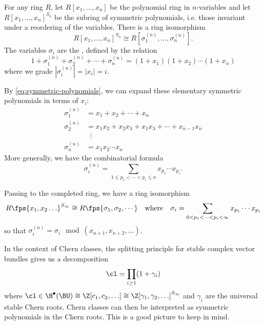 \begin{theorem}
	For any ring $R$, let $R[x_1,\ldots, x_n]$ be the polynomial ring in $n$-variables and let $R[x_1,\ldots, x_n]^{S_n}$ be the subring of symmetric polynomials, i.e. those invariant under a reordering of the variables. There is a ring isomorphism
	\begin{equation}\label{eq:symmetric-polynomial-isomorphism}
		R[x_1,\ldots, x_n]^{S_n} \cong R[\sigma_1^{(n)},\ldots, \sigma_n^{(n)}].
	\end{equation}
	The variables $\sigma_i$ are the , defined by the relation
	\begin{equation}\label{eq:symmetric-polynomials}
		1+\sigma_1^{(n)}+\sigma_2^{(n)}+\cdots+\sigma_n^{(n)} = (1+x_1)(1+x_2)\cdots (1+x_n)
	\end{equation}
	where we grade $|\sigma_i^{(n)}|=|x_i|=i$.
\end{theorem}

By \cref{eq:symmetric-polynomials}, we can expand these elementary symmetric polynomials in terms of $x_i$:
\[
	\begin{aligned}
		\sigma_1^{(n)} &= x_1+x_2+\cdots + x_n\\
		\sigma_2^{(n)} &= x_1x_2 + x_2x_3 + x_1x_3 +\cdots + x_{n-1}x_n\\
						 &\;\;\vdots\\
		\sigma_n^{(n)} &= x_1x_2\cdots x_n
	\end{aligned}
\]
More generally, we have the combinatorial formula
\[
	\sigma_i^{(n)} = \sum_{1\leq p_1<\cdots <p_i\leq n} x_{p_1}\cdots x_{p_i}.
\]
\begin{remark}
	Passing to the completed ring, we have a ring isomorphism
\[
	R\fps{x_1,x_2\ldots}^{S_\infty} \cong R\fps{\sigma_1,\sigma_2,\cdots}\quad\textrm{where}\quad \sigma_i = \sum_{0<p_1<\cdots < p_i<\infty}x_{p_1}\cdots x_{p_i}
\]
so that $\sigma_i^{(n)} = \sigma_i \mod (x_{n+1},x_{n+2},\ldots)$.
\end{remark}

In the context of Chern classes, the splitting principle for stable complex vector bundles gives us a decomposition
\[
	\cl = \prod_{i\geq 1}(1+\gamma_i)
\]
where $\cl\in \H^\bullet(\BU) \cong \Z[c_1,c_2,\ldots]\cong \Z[\gamma_1,\gamma_2,\ldots]^{S_\infty}$ and $\gamma_i$ are the universal stable Chern roots. Chern classes can then be interpreted as symmetric polynomials in the Chern roots. This is a good picture to keep in mind.

